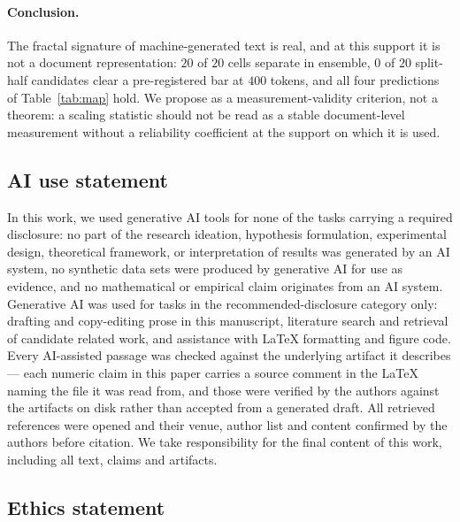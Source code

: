 \documentclass{article}
\begin{document}
\paragraph{Conclusion.}
The fractal signature of machine-generated text is real, and at this support
it is not a document representation: $20$ of $20$ cells separate in
ensemble, $0$ of $20$ split-half candidates clear a pre-registered bar at
$400$ tokens, and all four predictions of Table~\ref{tab:map} hold. We
propose as a measurement-validity criterion, not a theorem: a scaling
statistic should not be read as a stable document-level measurement without
a reliability coefficient at the support on which it is used.

\subsection*{AI use statement}

In this work, we used generative AI tools for none of the tasks carrying a
required disclosure: no part of the research ideation, hypothesis formulation,
experimental design, theoretical framework, or interpretation of results was
generated by an AI system, no synthetic data sets were produced by generative AI
for use as evidence, and no mathematical or empirical claim originates from an
AI system. Generative AI was used for tasks in the recommended-disclosure
category only: drafting and copy-editing prose in this manuscript, literature
search and retrieval of candidate related work, and assistance with LaTeX
formatting and figure code. Every AI-assisted passage was checked against the
underlying artifact it describes --- each numeric claim in this paper carries a
source comment in the LaTeX naming the file it was read from, and those were
verified by the authors against the artifacts on disk rather than accepted from
a generated draft. All retrieved references were opened and their venue, author
list and content confirmed by the authors before citation. We take
responsibility for the final content of this work, including all text, claims
and artifacts.

\subsection*{Ethics statement}
\end{document}
